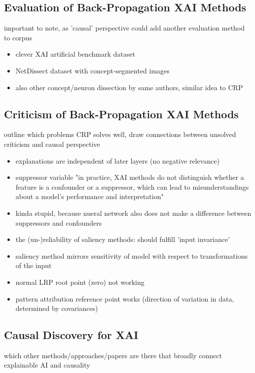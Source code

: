 \subsection{Evaluation of Back-Propagation XAI Methods}
{\color{red} important to note, as 'causal' perspective could add another evaluation method to corpus}

\begin{itemize}
      \item clever XAI artificial benchmark dataset \cite{Arras2022}
      \item NetDissect dataset with concept-segmented images \cite{Bau2017}
      \item also other concept/neuron dissection by same authors, similar idea to CRP \cite{Bau2020}
\end{itemize}

\subsection{Criticism of Back-Propagation XAI Methods}
{\color{red} outline which problems CRP solves well, draw connections between unsolved criticism and causal perspective}

\begin{itemize}
      \item explanations are independent of later layers (no negative relevance) \cite{Sixt2020}
      \item suppressor variable "in practice, XAI methods do not distinguish whether a feature is a confounder or a suppressor, which can lead to misunderstandings about a model’s performance and interpretation"
      \item kinda stupid, because nueral network also does not make a difference between suppressors and confounders \cite{Wilming2023}
      \item the (un-)reliability of saliency methods: should fulfill 'input invariance'
      \item saliency method mirrors sensitivity of model with respect to transformations of the input
      \item normal LRP root point (zero) not working
      \item pattern attribution reference point works (direction of variation in data, determined by covariances) \cite{Kindermans2019}
\end{itemize}

\subsection{Causal Discovery for XAI}
{\color{red} which other methods/approaches/papers are there that broadly connect explainable AI and causality }

